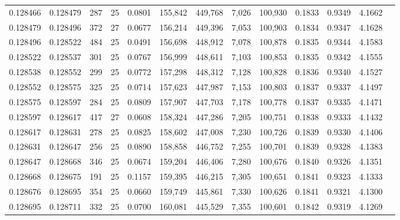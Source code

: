 \begin{tabular}{rrrrrrrrrrrrr}
0.128466 & 0.128479 &   287 &  25 &                                     0.0801 & 155,842 & 449,768 &   7,026 & 100,930 & 0.1833 & 0.9349 & 4.1662 \\
0.128479 & 0.128496 &   372 &  27 &                                     0.0677 & 156,214 & 449,396 &   7,053 & 100,903 & 0.1834 & 0.9347 & 4.1628 \\
0.128496 & 0.128522 &   484 &  25 &                                     0.0491 & 156,698 & 448,912 &   7,078 & 100,878 & 0.1835 & 0.9344 & 4.1583 \\
0.128522 & 0.128537 &   301 &  25 &                                     0.0767 & 156,999 & 448,611 &   7,103 & 100,853 & 0.1835 & 0.9342 & 4.1555 \\
0.128538 & 0.128552 &   299 &  25 &                                     0.0772 & 157,298 & 448,312 &   7,128 & 100,828 & 0.1836 & 0.9340 & 4.1527 \\
0.128552 & 0.128575 &   325 &  25 &                                     0.0714 & 157,623 & 447,987 &   7,153 & 100,803 & 0.1837 & 0.9337 & 4.1497 \\
0.128575 & 0.128597 &   284 &  25 &                                     0.0809 & 157,907 & 447,703 &   7,178 & 100,778 & 0.1837 & 0.9335 & 4.1471 \\
0.128597 & 0.128617 &   417 &  27 &                                     0.0608 & 158,324 & 447,286 &   7,205 & 100,751 & 0.1838 & 0.9333 & 4.1432 \\
0.128617 & 0.128631 &   278 &  25 &                                     0.0825 & 158,602 & 447,008 &   7,230 & 100,726 & 0.1839 & 0.9330 & 4.1406 \\
0.128631 & 0.128647 &   256 &  25 &                                     0.0890 & 158,858 & 446,752 &   7,255 & 100,701 & 0.1839 & 0.9328 & 4.1383 \\
0.128647 & 0.128668 &   346 &  25 &                                     0.0674 & 159,204 & 446,406 &   7,280 & 100,676 & 0.1840 & 0.9326 & 4.1351 \\
0.128668 & 0.128675 &   191 &  25 &                                     0.1157 & 159,395 & 446,215 &   7,305 & 100,651 & 0.1841 & 0.9323 & 4.1333 \\
0.128676 & 0.128695 &   354 &  25 &                                     0.0660 & 159,749 & 445,861 &   7,330 & 100,626 & 0.1841 & 0.9321 & 4.1300 \\
0.128695 & 0.128711 &   332 &  25 &                                     0.0700 & 160,081 & 445,529 &   7,355 & 100,601 & 0.1842 & 0.9319 & 4.1269 \\

\end{tabular}
